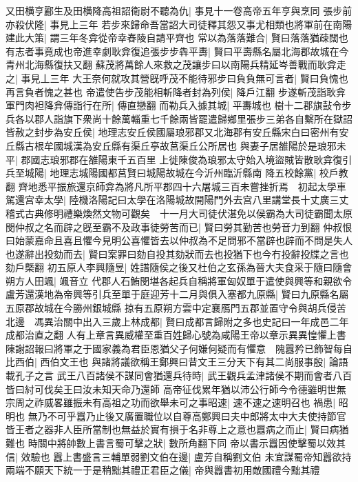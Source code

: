 又田横亨酈生及田横降高祖詔衛尉不聽為仇|{
	事見十一卷高帝五年亨與烹同}
張步前亦殺伏隆|{
	事見上三年}
若步來歸命吾當詔大司徒釋其怨又事尤相類也將軍前在南陽建此大策|{
	謂三年冬弇從帝幸舂陵自請平齊也}
常以為落落難合|{
	賢曰落落猶疎闊也}
有志者事竟成也帝進幸劇耿弇復追張步步犇平夀|{
	賢曰平壽縣名屬北海郡故城在今青州北海縣復扶又翻}
蘇茂將萬餘人來救之茂讓步曰以南陽兵精延岑善戰而耿弇走之|{
	事見丄三年}
大王奈何就攻其營旣呼茂不能待邪步曰負負無可言者|{
	賢曰負愧也再言負者愧之甚也}
帝遣使告步茂能相斬降者封為列侯|{
	降戶江翻}
步遂斬茂詣耿弇軍門肉袒降弇傳詣行在所|{
	傳直戀翻}
而勒兵入據其城|{
	平夀城也}
樹十二郡旗鼔令步兵各以郡人詣旗下衆尚十餘萬輜重七千餘兩皆罷遣歸鄉里張步三弟各自繫所在獄詔皆赦之封步為安丘侯|{
	地理志安丘侯國屬琅邪郡又北海郡有安丘縣宋白曰密州有安丘縣古根牟國城漢為安丘縣有渠丘亭故莒渠丘公所居也}
與妻子居雒陽於是琅邪未平|{
	郡國志琅邪郡在雒陽東千五百里}
上徙陳俊為琅邪太守始入境盜賊皆散耿弇復引兵至城陽|{
	地理志城陽國都莒賢曰城陽故城在今沂州臨沂縣南}
降五校餘黨|{
	校戶教翻}
齊地悉平振旅還京師弇為將凡所平郡四十六屠城三百未嘗挫折焉　初起太學車駕還宫幸太學|{
	陸機洛陽記曰太學在洛陽城故開陽門外去宫八里講堂長十丈廣三丈}
稽式古典修明禮樂煥然文物可觀矣　十一月大司徒伏湛免以侯霸為大司徒霸聞太原閔仲叔之名而辟之旣至霸不及政事徒勞苦而已|{
	賢曰勞其勤苦也勞音力到翻}
仲叔恨曰始蒙嘉命且喜且懼今見明公喜懼皆去以仲叔為不足問邪不當辟也辟而不問是失人也遂辭出投劾而去|{
	賢曰案罪曰劾自投其劾狀而去也投猶下也今冇投辭投牒之言也劾戶槩翻}
初五原人李興隨昱|{
	姓譜隨侯之後又杜伯之玄孫為晉大夫食采于隨曰隨會}
朔方人田颯|{
	颯音立}
代郡人石鮪閔堪各起兵自稱將軍匈奴單于遣使與興等和親欲令盧芳還漢地為帝興等引兵至單于庭迎芳十二月與俱入塞都九原縣|{
	賢曰九原縣名屬五原郡故城在今勝州銀城縣}
掠有五原朔方雲中定襄鴈門五郡並置守令與胡兵侵苦北邊　馮異治關中出入三歲上林成都|{
	賢曰成都言歸附之多也史記曰一年成邑二年成都治直之翻}
人有上章言異威權至重百姓歸心號為咸陽王帝以章示異異惶懼上書陳謝詔報曰將軍之于國家義為君臣恩猶父子何嫌何疑而有懼意　隗囂矜已飾智每自比西伯|{
	西伯文王也}
與諸將議欲稱王鄭興曰昔文王三分天下有其二尚服事殷|{
	論語載孔子之言}
武王八百諸侯不謀同會猶還兵待時|{
	武王觀兵孟津諸侯不期而會者八百皆曰紂可伐矣王曰汝未知天命乃還師}
高帝征伐累年猶以沛公行師今令德雖明世無宗周之祚威畧雖振未有高祖之功而欲舉未可之事昭速|{
	速不速之速明召也}
禍患|{
	昭明也}
無乃不可乎囂乃止後又廣置職位以自尊高鄭興曰夫中郎將太中大夫使持節官皆王者之器非人臣所當制也無益於實有損于名非尊上之意也囂病之而止|{
	賢曰病猶難也}
時關中將帥數上書言蜀可擊之狀|{
	數所角翻下同}
帝以書示囂因使擊蜀以效其信|{
	效驗也}
囂上書盛言三輔單弱劉文伯在邊|{
	盧芳自稱劉文伯}
未宜謀蜀帝知囂欲持兩端不願天下統一于是稍黜其禮正君臣之儀|{
	帝與囂書初用敵國禮今黜其禮}
